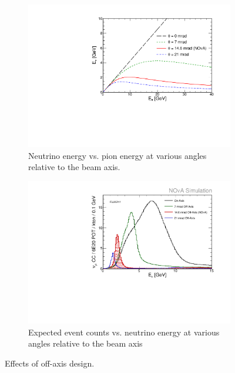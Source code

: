 \begin{figure}
\centering
\begin{subfigure}[c]{0.8\textwidth}
                \centering
                \includegraphics[width=\textwidth]{figures/plots/nova/EnuVSEpi_NOvA-0-7-21.pdf}
                \caption{Neutrino energy vs. pion energy at various angles relative to the beam axis.}
                 \label{EnuEpi}
        \end{subfigure}


\begin{subfigure}[c]{0.8\textwidth}
                \centering
                \includegraphics[width=\textwidth]{figures/plots/nova/spectrum_FD_NOvA-0-7-21.pdf}
                \caption{Expected \numu event counts vs. neutrino energy at various angles relative to the beam axis}
                \label{fluxEnu}

        \end{subfigure}
        \caption{Effects of off-axis design.}
\end{figure}

